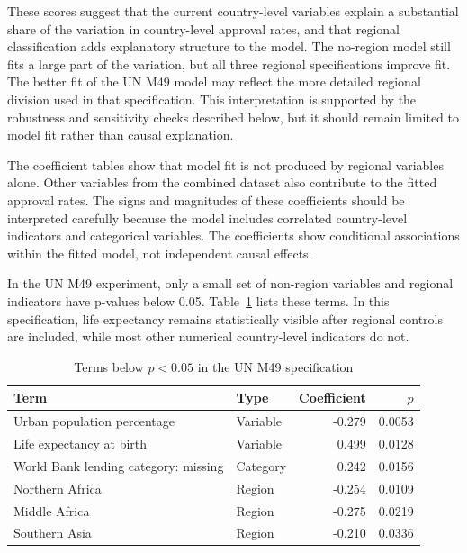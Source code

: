 \documentclass[runningheads]{llncs}
\begin{document}
These scores suggest that the current country-level variables explain a substantial share of the variation in country-level approval rates, and that regional classification adds explanatory structure to the model. The no-region model still fits a large part of the variation, but all three regional specifications improve fit. The better fit of the UN M49 model may reflect the more detailed regional division used in that specification. This interpretation is supported by the robustness and sensitivity checks described below, but it should remain limited to model fit rather than causal explanation.

The coefficient tables show that model fit is not produced by regional variables alone. Other variables from the combined dataset also contribute to the fitted approval rates. The signs and magnitudes of these coefficients should be interpreted carefully because the model includes correlated country-level indicators and categorical variables. The coefficients show conditional associations within the fitted model, not independent causal effects.

In the UN M49 experiment, only a small set of non-region variables and regional indicators have p-values below 0.05. Table~\ref{tab:un-m49-significant-terms} lists these terms. In this specification, life expectancy remains statistically visible after regional controls are included, while most other numerical country-level indicators do not.

\begin{table}
\caption{Terms below $p < 0.05$ in the UN M49 specification}
\label{tab:un-m49-significant-terms}
\centering
\renewcommand{\arraystretch}{1.2}
\setlength{\tabcolsep}{7pt}
\begin{tabular}{llrr}
\hline
Term & Type & Coefficient & $p$ \\
\hline
Urban population percentage & Variable & -0.279 & 0.0053 \\
Life expectancy at birth & Variable & 0.499 & 0.0128 \\
World Bank lending category: missing & Category & 0.242 & 0.0156 \\
Northern Africa & Region & -0.254 & 0.0109 \\
Middle Africa & Region & -0.275 & 0.0219 \\
Southern Asia & Region & -0.210 & 0.0336 \\
\hline
\end{tabular}
\end{table}
\end{document}
